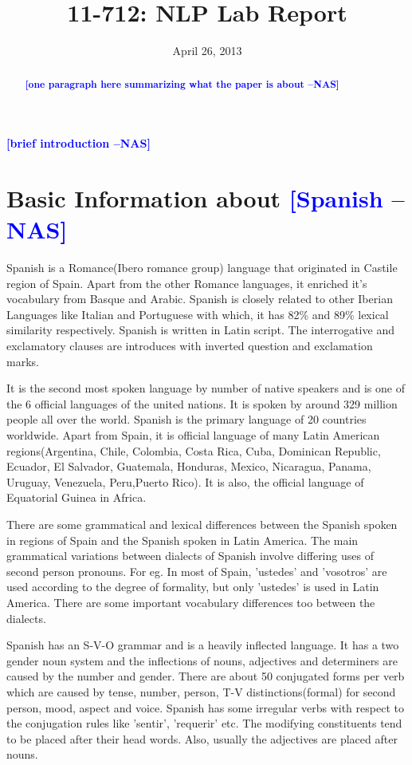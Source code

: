 \documentclass[11pt,letterpaper]{article}
\title{11-712:  NLP Lab Report}
\author{\nascomment{Kartik Goyal}}
\date{April 26, 2013 \nascomment{due date}}
\newcommand{\nascomment}[1]{\textcolor{blue}{\textbf{[#1 --NAS]}}}
\begin{document}
\maketitle
\begin{abstract}
\nascomment{one paragraph here summarizing what the paper is about}
\end{abstract}

\nascomment{brief introduction}

\section{Basic Information about \nascomment{Spanish}}

Spanish is a Romance(Ibero romance group) language that originated in Castile region of Spain. Apart from the other Romance languages, it enriched it's vocabulary from Basque and Arabic. Spanish is closely related to other Iberian Languages like Italian and Portuguese with which, it has 82\% and 89\% lexical similarity respectively. Spanish is written in Latin script. The interrogative and exclamatory clauses are introduces with inverted question and exclamation marks. 

It is the second most spoken language by number of native speakers and is one of the 6 official languages of the united nations. It is spoken by around 329 million people all over the world. Spanish is the primary language of 20 countries worldwide. Apart from Spain, it is official language of many Latin American regions(Argentina, Chile, Colombia, Costa Rica, Cuba, Dominican Republic, Ecuador, El Salvador, Guatemala, Honduras, Mexico, Nicaragua, Panama, Uruguay, Venezuela, Peru,Puerto Rico). It is also, the official language of Equatorial Guinea in Africa.

There are some grammatical and lexical differences between the Spanish spoken in regions of Spain and the Spanish spoken in Latin America. The main grammatical variations between dialects of Spanish involve differing uses of second person pronouns. For eg. In most of Spain, 'ustedes' and 'vosotros' are used according to the degree of formality, but only 'ustedes' is used in Latin America. There are some important vocabulary differences too between the dialects.

Spanish has an S-V-O grammar and is a heavily inflected language. It has a two gender noun system and the inflections of nouns, adjectives and determiners are caused by the number and gender. There are about 50 conjugated forms per verb which are caused by tense, number, person, T-V distinctions(formal) for second person, mood, aspect and voice. Spanish has some irregular verbs with respect to the conjugation rules like 'sentir', 'requerir' etc. The modifying constituents tend to be placed after their head words. Also, usually the adjectives are placed after nouns.
\end{document}
